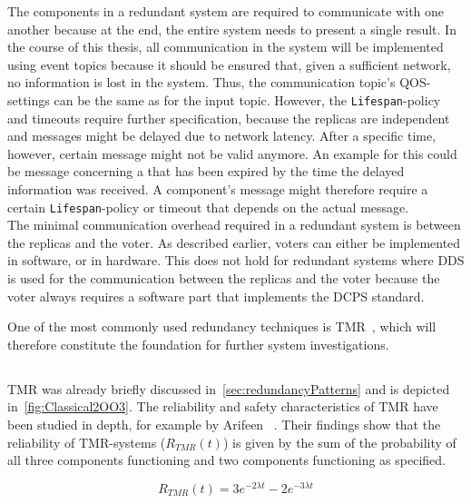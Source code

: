 The components in a redundant system are required to communicate with one another because at the end, the entire system needs to present a single result.
In the course of this thesis, all communication in the system will be implemented using  event topics because it should be ensured that, given a sufficient network, no information is lost in the system.
Thus, the communication topic's \gls*{QOS}-settings can be the same as for the input topic.
However, the \texttt{Lifespan}-policy and timeouts require further specification, because the replicas are independent and messages might be delayed due to network latency.
After a specific time, however, certain message might not be valid anymore.
An example for this could be message concerning a  that has been expired by the time the delayed information was received.
A component's message might therefore require a certain \texttt{Lifespan}-policy or timeout that depends on the actual message.
\\

The minimal communication overhead required in a redundant system is between the replicas and the voter.
As described earlier, voters can either be implemented in software, or in hardware.
This does not hold for redundant systems where \gls*{DDS} is used for the communication between the replicas and the voter because the voter always requires a software part that implements the \gls*{DCPS} standard.

One of the most commonly used redundancy techniques is \gls*{TMR}~\cite{FaultToleranceViaNMR}, which will therefore constitute the foundation for further system investigations.

\subsection{}
\Gls*{TMR} was already briefly discussed in~\autoref{sec:redundancyPatterns} and is depicted in~\autoref{fig:Classical2OO3}.
The reliability and safety characteristics of \gls*{TMR} have been studied in depth, for example by Arifeen \etal~\cite{ArifeenFaultTolerantTMR}.
Their findings show that the reliability of \gls*{TMR}-systems ($R_{TMR}(t)$) is given by the sum of the probability of all three components functioning and two components functioning as specified.

\begin{equation}
R_{TMR}(t) = 3e^{-2 \lambda t} - 2e^{-3 \lambda t}
\end{equation}

